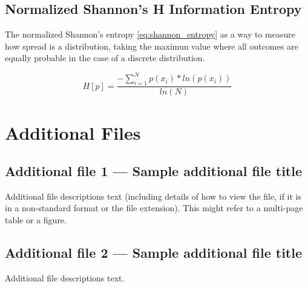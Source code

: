 \documentclass{bmcart}
\begin{document}
\begin{backmatter}
\subsection*{Normalized Shannon's H Information Entropy}

\par The normalized Shannon's entropy \ref{eq:shannon_entropy} as a way to measure how spread is a distribution, taking the maximun value where all outcomes are equally probable in the case of a discrete distribution.

\begin{equation}
H[p] = \frac{- \sum_{i = 1}^{N} p(x_i) * ln(p(x_i))}{ln(N)}
\label{eq:shannon_entropy}
\end{equation}






\section*{Additional Files}
  \subsection*{Additional file 1 --- Sample additional file title}
    Additional file descriptions text (including details of how to
    view the file, if it is in a non-standard format or the file extension).  This might
    refer to a multi-page table or a figure.

  \subsection*{Additional file 2 --- Sample additional file title}
    Additional file descriptions text.


\end{backmatter}
\end{document}
